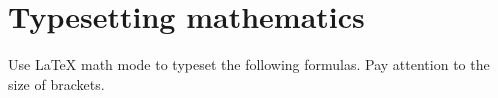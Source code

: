 \section{Typesetting mathematics}

Use \LaTeX{} math mode to typeset the following formulas.
Pay attention to the size of brackets.

